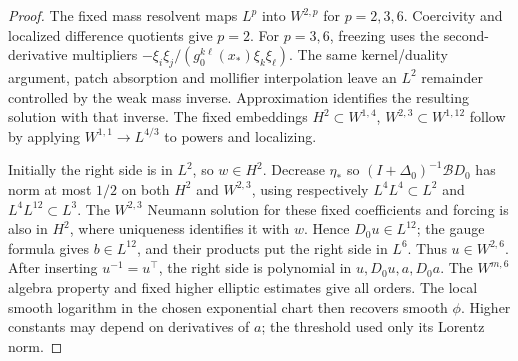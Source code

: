 \documentclass[11pt]{article}
\numberwithin{equation}{section}
\theoremstyle{definition}
\theoremstyle{remark}
\begin{document}
\begin{proof}
The fixed mass resolvent maps \(L^p\) into \(W^{2,p}\)
for \(p=2,3,6\). Coercivity and localized difference
quotients give \(p=2\). For \(p=3,6\), freezing uses the
second-derivative multipliers
\(-\xi_i\xi_j/(g_0^{k\ell}(x_*)\xi_k\xi_\ell)\).
The same kernel/duality argument, patch absorption and
mollifier interpolation leave an \(L^2\) remainder
controlled by the weak mass inverse. Approximation
identifies the resulting solution with that inverse.
The fixed embeddings
\(H^2\subset W^{1,4}\), \(W^{2,3}\subset W^{1,12}\)
follow by applying \(W^{1,1}\to L^{4/3}\) to powers
and localizing.

Initially the right side is in \(L^2\), so \(w\in H^2\).
Decrease \(\eta_*\) so
\((I+\Delta_0)^{-1}\mathcal B D_0\) has norm at most
\(1/2\) on both \(H^2\) and \(W^{2,3}\), using respectively
\(L^4L^4\subset L^2\) and \(L^4L^{12}\subset L^3\).
The \(W^{2,3}\) Neumann solution for these fixed
coefficients and forcing is also in \(H^2\), where
uniqueness identifies it with \(w\). Hence \(D_0u\in L^{12}\);
the gauge formula gives \(b\in L^{12}\), and their products
put the right side in \(L^6\). Thus \(u\in W^{2,6}\).
After inserting \(u^{-1}=u^\top\), the right side is
polynomial in \(u,D_0u,a,D_0a\). The \(W^{m,6}\) algebra
property and fixed higher elliptic estimates give all orders.
The local smooth logarithm in the chosen exponential chart
then recovers smooth \(\phi\). Higher constants may depend
on derivatives of \(a\); the threshold used only its
Lorentz norm.
\end{proof}
\end{document}
